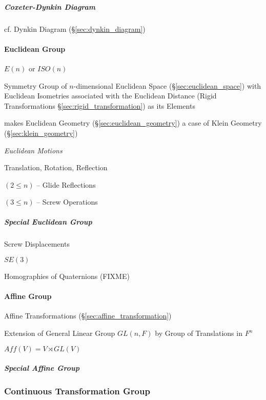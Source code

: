 \subparagraph{Coxeter-Dynkin Diagram}\label{sec:coxeter_dynkin_diagram}\hfill

cf. Dynkin Diagram (\S\ref{sec:dynkin_diagram})



\paragraph{Euclidean Group}\label{sec:euclidean_group}\hfill

$E(n)$ or $ISO(n)$

Symmetry Group of $n$-dimensional Euclidean Space (\S\ref{sec:euclidean_space})
with Euclidean Isometries associated with the Euclidean Distance (Rigid
Transformations \S\ref{sec:rigid_transformation}) as its Elements

makes Euclidean Geometry (\S\ref{sec:euclidean_geometry}) a case of
Klein Geometry (\S\ref{sec:klein_geometry})


\emph{Euclidean Motions}

Translation, Rotation, Reflection

$(2 \leq n)$ -- Glide Reflections

$(3 \leq n)$ -- Screw Operations



\subparagraph{Special Euclidean Group}\label{sec:special_euclidean}\hfill

Screw Displacements

$SE(3)$

Homographies of Quaternions (FIXME)



\paragraph{Affine Group}\label{sec:affine_group}\hfill

Affine Transformations (\S\ref{sec:affine_transformation})

Extension of General Linear Group $GL(n,F)$ by Group of Translations in $F^n$

$Aff(V) = V \rtimes GL(V)$



\subparagraph{Special Affine Group}\label{sec:special_affine_group}\hfill



\subsubsection{Continuous Transformation Group}
\label{sec:continuous_transformation_group}

